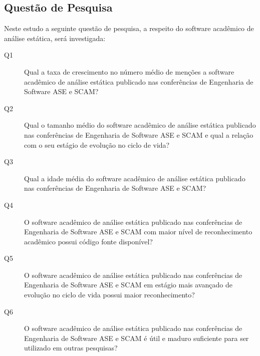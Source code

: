 
\subsection{Questão de Pesquisa}

Neste estudo a seguinte questão de pesquisa, a respeito do software acadêmico
de análise estática, será investigada:

\newcommand{\QuestaoUm}{
  Qual a taxa de crescimento no número médio de menções a software acadêmico de
  análise estática publicado nas conferências de Engenharia de Software ASE e
  SCAM?
}
\newcommand{\QuestaoDois}{
  Qual o tamanho médio do software acadêmico de análise estática publicado nas conferências de
  Engenharia de Software ASE e SCAM e qual a relação com o seu estágio de evolução no
  ciclo de vida?
}
\newcommand{\QuestaoTres}{
  Qual a idade média do software acadêmico de análise estática publicado nas conferências de
  Engenharia de Software ASE e SCAM?
}
\newcommand{\QuestaoQuatro}{
  O software acadêmico de análise estática publicado nas conferências de
  Engenharia de Software ASE e SCAM com maior nível de reconhecimento
  acadêmico possui código fonte disponível?
}
\newcommand{\QuestaoCinco}{
  O software acadêmico de análise estática publicado nas conferências de
  Engenharia de Software ASE e SCAM em estágio mais avançado de evolução
  no ciclo de vida possui maior reconhecimento?
}
\newcommand{\QuestaoSeis}{
  O software acadêmico de análise estática publicado nas conferências de
  Engenharia de Software ASE e SCAM é útil e maduro suficiente para ser
  utilizado em outras pesquisas?
}
\newcommand{\QuestaoSete}{
  O software acadêmico de análise estática publicado nas conferências de
  Engenharia de Software ASE e SCAM é sustentável tecnicamente?
}

\begin{description}
  \item [Q1] \QuestaoUm
  \item [Q2] \QuestaoDois
  \item [Q3] \QuestaoTres
  \item [Q4] \QuestaoQuatro
  \item [Q5] \QuestaoCinco
  \item [Q6] \QuestaoSeis
\end{description}

